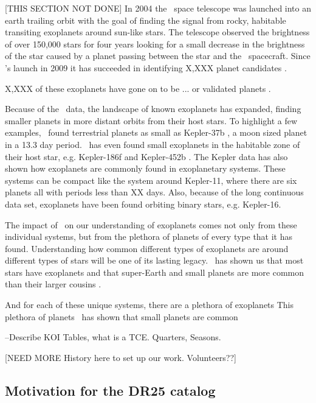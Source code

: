[THIS SECTION NOT DONE]
In 2004 the \Kepler\ space telescope was launched into an earth trailing orbit with the goal of finding the signal from rocky, habitable transiting exoplanets \citep{Koch2010} around sun-like stars. The telescope observed the brightness of over 150,000 stars for four years looking for a small decrease in the brightness of the star caused by a planet passing between the star and the \Kepler\ spacecraft. 
Since \Kepler's launch in 2009 it has succeeded in identifying X,XXX planet candidates \citep{Borucki2010a,Coughlin2016}. 

X,XXX of these exoplanets have gone on to be ... or validated planets \citep[see most recently][]{Morton2016}.  %

Because of the \Kepler\ data, the landscape of known exoplanets has expanded, finding smaller planets in more distant orbits from their host stars.  To highlight a few examples,  \Kepler\ found terrestrial planets as small as Kepler-37b \citep{Barclay2013}, a moon sized planet in a 13.3 day period. \Kepler\ has even found small exoplanets in the habitable zone of their host star, e.g. Kepler-186f \citep{Quintana2014} and Kepler-452b \citep{Jenkins2015}.  The Kepler data has also shown how exoplanets are commonly found in exoplanetary systems. These systems can be compact like the system around Kepler-11, where there are six planets all with periods less than XX days. Also, because of the long continuous data set, exoplanets have been found orbiting binary stars, e.g. Kepler-16\citep{Doyle2011}.


The impact of \Kepler\ on our understanding of exoplanets comes not only from these individual systems, but from the plethora of planets of every type that it has found. Understanding how common different types of exoplanets are around different types of stars will be one of its lasting legacy. \Kepler\ has shown us that most stars have exoplanets and that super-Earth and small planets are more common than their larger cousins \citet{Burke2015}.  

And for each of these unique systems, there are a plethora of exoplanets This plethora of planets \Kepler\ has shown that small planets are common 

--Describe KOI Tables, what is a TCE.  Quarters, Seasons.

[NEED MORE History here to set up our work. Volunteers??]

\subsection{Motivation for the DR25 catalog}

